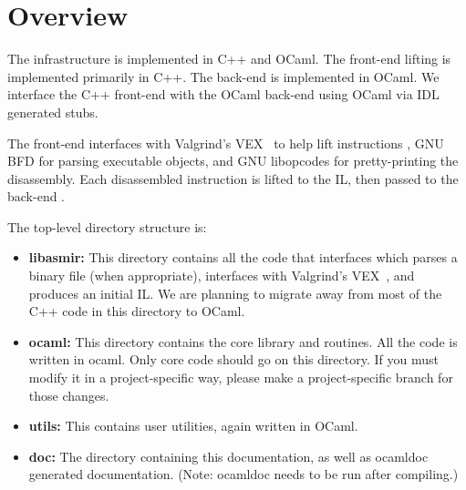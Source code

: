 \section{Overview}

The \bap infrastructure is implemented in C++ and OCaml.  The
front-end lifting is implemented primarily in C++.  The back-end is
implemented in OCaml. We interface the C++ front-end with the OCaml
back-end using OCaml via IDL generated stubs.

The front-end interfaces with Valgrind's
VEX~\cite{nethercote:2004:phd} to help lift instructions%
, GNU BFD for parsing executable objects,
and GNU libopcodes for pretty-printing the disassembly. Each
disassembled instruction is lifted to the IL, then passed to the
back-end .  

The \bap top-level directory structure is:
\begin{itemize}\squish
\item {\bf libasmir:} This directory contains all the code that
  interfaces which parses a binary file (when appropriate), interfaces
  with Valgrind's VEX~\cite{nethercote:2004:phd}, and produces an
  initial IL.  We are planning to migrate away from most of the
  C++ code in this directory to OCaml.

\item {\bf ocaml:} This directory contains the core \bap library and
  routines. All the code is written in ocaml. Only core \bap code
  should go on this directory. If you must modify it in a
  project-specific way, please make a project-specific branch for
  those changes.

\item {\bf utils:} This contains user utilities, again written in OCaml.

\item {\bf doc:} The directory containing this documentation, as well
  as ocamldoc generated documentation. (Note: ocamldoc needs to be run
  after compiling.)
\end{itemize}
